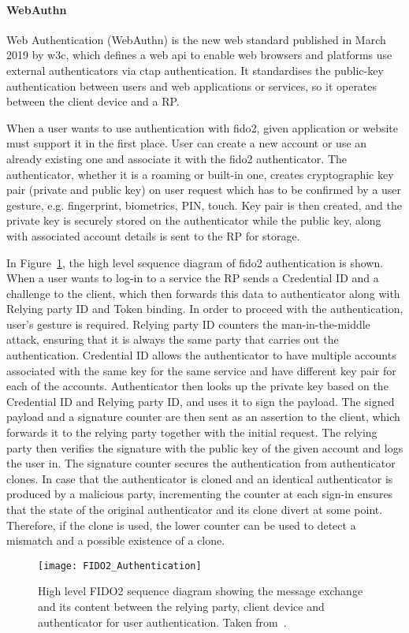 \paragraph{WebAuthn} 
Web Authentication (WebAuthn) is the new web standard published in March 2019  by \acrshort{w3c}, which defines a web \acrshort{api} to enable web browsers and platforms use external authenticators via \acrshort{ctap} authentication. It standardises the public-key authentication between users and web applications or services, so it operates between the client device and a RP.

When a user wants to use authentication with \acrshort{fido}2, given application or website must support it in the first place. User can create a new account or use an already existing one and associate it with the \acrshort{fido}2 authenticator. The authenticator, whether it is a roaming or built-in one, creates cryptographic key pair (private and public key) on user request which has to be confirmed by a user gesture, e.g. fingerprint, biometrics, PIN, touch. Key pair is then created, and the private key is securely stored on the authenticator while the public key, along with associated account details is sent to the RP for storage.

In Figure~\ref{fig:fido2_authentication}, the high level sequence diagram of \acrshort{fido}2 authentication is shown. When a user wants to log-in to a service the RP sends a Credential ID and a challenge to the client, which then forwards this data to authenticator along with Relying party ID and Token binding. In order to proceed with the authentication, user's gesture is required. Relying party ID counters the man-in-the-middle attack, ensuring that it is always the same party that carries out the authentication. Credential ID allows the authenticator to have multiple accounts associated with the same key for the same service and have different key pair for each of the accounts. Authenticator then looks up the private key based on the Credential ID and Relying party ID, and uses it to sign the payload. The signed payload and a signature counter are then sent as an assertion to the client, which forwards it to the relying party together with the initial request. The relying party then verifies the signature with the public key of the given account and logs the user in. The signature counter secures the authentication from authenticator clones. In case that the authenticator is cloned and an identical authenticator is produced by a malicious party, incrementing the counter at each sign-in ensures that the state of the original authenticator and its clone divert at some point. Therefore, if the clone is used, the lower counter can be used to detect a mismatch and a possible existence of a clone.

\begin{figure}[ht]
    \centering
    \texttt{[image: FIDO2\_Authentication]}
    \caption{High level FIDO2 sequence diagram showing the message exchange and its content between the relying party, client device and authenticator for user authentication. Taken from~\cite{Yuriy2019IntroductionAPI}.}
    \label{fig:fido2_authentication}
\end{figure}